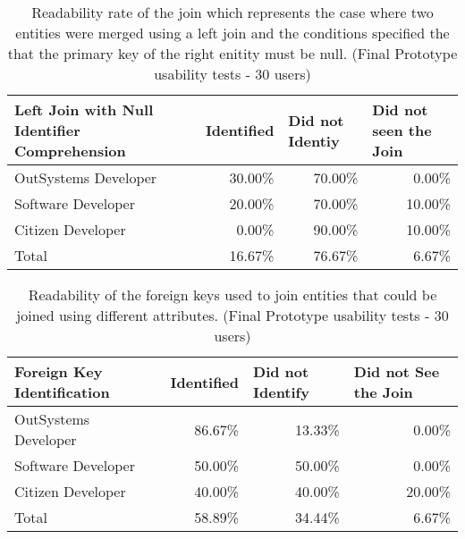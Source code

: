 \begin{table}[tb]
  \caption{Readability rate of the join which represents the case where two entities were merged using a left join and the conditions specified the that the primary key of the right enitity must be null. (Final Prototype usability tests - 30 users)}
    \label{tab:finalPrototypeLeftJoinNull}
  \begin{tabular}{@{}m{5.4cm}rrr@{}}
  \toprule
  \textbf{Left Join with Null Identifier Comprehension} & \multicolumn{1}{l}{Identified} & \multicolumn{1}{l}{Did not Identiy} & \multicolumn{1}{l}{Did not seen the Join} \\ \midrule
  OutSystems Developer                                  & 30.00\%                        & 70.00\%                                & 0.00\%                                    \\
  Software Developer                                    & 20.00\%                        & 70.00\%                                & 10.00\%                                   \\
  Citizen Developer                                     & 0.00\%                         & 90.00\%                                & 10.00\%                                   \\
  Total                                                 & 16.67\%                        & 76.67\%                                & 6.67\%                                    \\ \bottomrule
  \end{tabular}
  \end{table}


\begin{table}[tb]
  \caption{Readability of the foreign keys used to join entities that could be joined using different attributes. (Final Prototype usability tests - 30 users)}
    \label{tab:finalPrototypeForeignKeyIdentification}
  \begin{tabular}{@{}lrrr@{}}
  \toprule
  \textbf{Foreign Key Identification} & \multicolumn{1}{l}{Identified} & \multicolumn{1}{l}{Did not Identify} & \multicolumn{1}{l}{Did not See the Join} \\ \midrule
  OutSystems Developer                & 86.67\%                        & 13.33\%                              & 0.00\%                                   \\
  Software Developer                  & 50.00\%                        & 50.00\%                              & 0.00\%                                   \\
  Citizen Developer                   & 40.00\%                        & 40.00\%                              & 20.00\%                                  \\
  Total                               & 58.89\%                        & 34.44\%                              & 6.67\%                                   \\ \bottomrule
  \end{tabular}
  \end{table}

